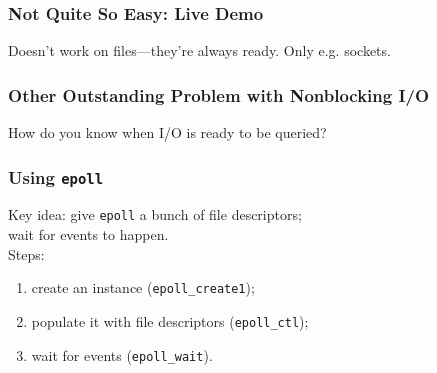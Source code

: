 \begin{frame}
  \frametitle{Not Quite So Easy: Live Demo}

    Doesn't work on files---they're always ready. Only e.g. sockets.

\end{frame}

\begin{frame}
  \frametitle{Other Outstanding Problem with Nonblocking I/O}

    How do you know when I/O is ready to be queried?


\end{frame}

\begin{frame}
  \frametitle{Using {\tt epoll}}
  
    Key idea: give {\tt epoll} a bunch of file descriptors;\\
     \hspace*{2em}wait for events to happen.\\[1em]

     Steps:
     \begin{enumerate}
       \item create an instance ({\tt epoll\_create1});
       \item populate it with file descriptors ({\tt epoll\_ctl});
       \item wait for events ({\tt epoll\_wait}).
     \end{enumerate}
  
\end{frame}


